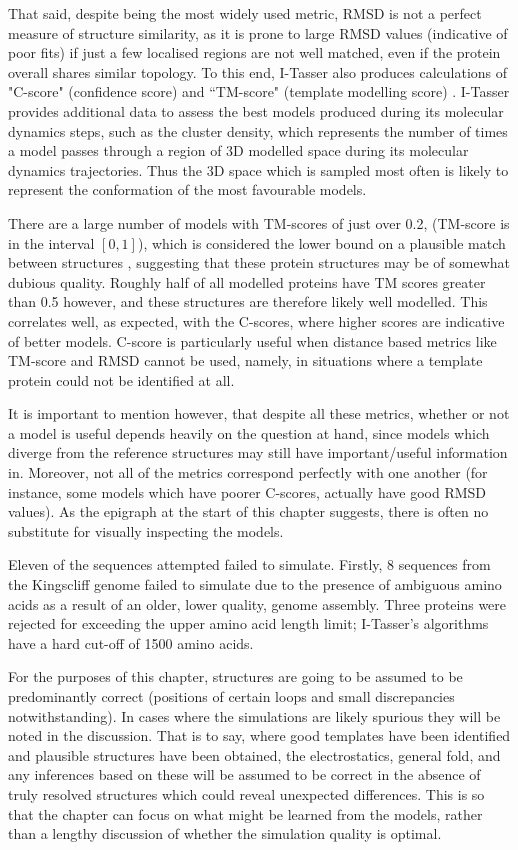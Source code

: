 That said, despite being the most widely used metric, RMSD is not a perfect measure of structure similarity, as it is prone to large RMSD values (indicative of poor fits) if just a few localised regions are not well matched, even if the protein overall shares similar topology. To this end, I-Tasser also produces calculations of "C-score" (confidence score) and ``TM-score" (template modelling score) \citep{Zhang2005}. I-Tasser provides additional data to assess the best models produced during its molecular dynamics steps, such as the cluster density, which represents the number of times a model passes through a region of 3D modelled space during its molecular dynamics trajectories. Thus the 3D space which is sampled most often is likely to represent the conformation of the most favourable models.

There are a large number of models with TM-scores of just over 0.2, (TM-score is in the interval $[0,1]$), which is considered the lower bound on a plausible match between structures \citep{Zhang2005}, suggesting that these protein structures may be of somewhat dubious quality. Roughly half of all modelled proteins have TM scores greater than 0.5 however, and these structures are therefore likely well modelled. This correlates well, as expected, with the C-scores, where higher scores are indicative of better models. C-score is particularly useful when distance based metrics like TM-score and RMSD cannot be used, namely, in situations where a template protein could not be identified at all.

It is important to mention however, that despite all these metrics, whether or not a model is useful depends heavily on the question at hand, since models which diverge from the reference structures may still have important/useful information in. Moreover, not all of the metrics correspond perfectly with one another (for instance, some models which have poorer C-scores, actually have good RMSD values). As the epigraph at the start of this chapter suggests, there is often no substitute for visually inspecting the models.

Eleven of the sequences attempted failed to simulate. Firstly, 8 sequences from the \Pasy{} Kingscliff genome failed to simulate due to the presence of ambiguous amino acids as a result of an older, lower quality, genome assembly. Three proteins were rejected for exceeding the upper amino acid length limit; I-Tasser's algorithms have a hard cut-off of 1500 amino acids. 

For the purposes of this chapter, structures are going to be assumed to be predominantly correct (positions of certain loops and small discrepancies notwithstanding). In cases where the simulations are likely spurious they will be noted in the discussion. That is to say, where good templates have been identified and plausible structures have been obtained, the electrostatics, general fold, and any inferences based on these will be assumed to be correct in the absence of truly resolved structures which could reveal unexpected differences. This is so that the chapter can focus on what might be learned from the models, rather than a lengthy discussion of whether the simulation quality is optimal.


